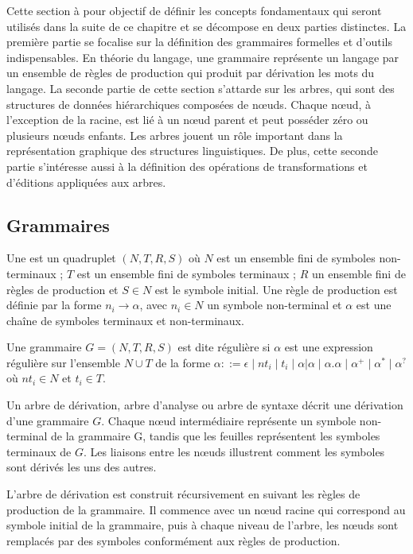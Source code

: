 Cette section à pour objectif de définir les concepts fondamentaux qui seront utilisés dans la suite de ce chapitre et se décompose en deux parties distinctes.
La première partie se focalise sur la définition des grammaires formelles et d'outils indispensables.
En théorie du langage, une grammaire représente un langage par un ensemble de règles de production qui produit par dérivation les mots du langage.
La seconde partie de cette section s'attarde sur les arbres, qui sont des structures de données hiérarchiques composées de nœuds.
Chaque nœud, à l'exception de la racine, est lié à un nœud parent et peut posséder zéro ou plusieurs nœuds enfants.
Les arbres jouent un rôle important dans la représentation graphique des structures linguistiques.
De plus, cette seconde partie s'intéresse aussi à la définition des opérations de transformations et d'éditions appliquées aux arbres.

\subsection{Grammaires}

\begin{definition}
    Une  est un quadruplet $(N, T, R, S)$ où $N$ est un ensemble fini de symboles non-terminaux ; $T$ est un ensemble fini de symboles terminaux ; $R$ un ensemble fini de règles de production et $S \in N$ est le symbole initial.
    Une règle de production est définie par la forme $n_i \to \alpha$, avec $n_i \in N$ un symbole non-terminal et $\alpha$ est une chaîne de symboles terminaux et non-terminaux.
\end{definition}

\begin{definition}
    Une grammaire $G = (N, T, R, S)$ est dite régulière si $\alpha$ est une expression régulière sur l'ensemble $N \cup T$ de la forme $\alpha ::= \epsilon \mid nt_i \mid t_i \mid \alpha|\alpha \mid \alpha.\alpha \mid \alpha^+ \mid \alpha^* \mid \alpha^?$ où $nt_i \in N$ et $t_i \in T$.
\end{definition}

\begin{definition}
    Un arbre de dérivation, arbre d'analyse ou arbre de syntaxe décrit une dérivation d'une grammaire $G$.
    Chaque nœud intermédiaire représente un symbole non-terminal de la grammaire G, tandis que les feuilles représentent les symboles terminaux de $G$.
    Les liaisons entre les nœuds illustrent comment les symboles sont dérivés les uns des autres.

    L'arbre de dérivation est construit récursivement en suivant les règles de production de la grammaire.
    Il commence avec un nœud racine qui correspond au symbole initial de la grammaire, puis à chaque niveau de l'arbre, les nœuds sont remplacés par des symboles conformément aux règles de production.
\end{definition}

